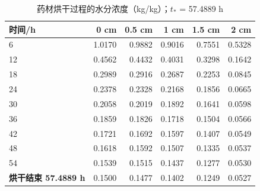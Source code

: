 \begin{table}[H]
  \centering
  \caption{药材烘干过程的水分浓度（kg/kg）；$t_*$ = 57.4889 h}
  \label{tab:p3C}
  \footnotesize
  \begin{tabular}{@{}lrrrrr@{}}
    \toprule
    时间/h & 0 cm & 0.5 cm & 1 cm & 1.5 cm & 2 cm \\
    \midrule
    6 & 1.0170 & 0.9882 & 0.9016 & 0.7551 & 0.5328 \\
    12 & 0.4562 & 0.4432 & 0.4031 & 0.3298 & 0.1642 \\
    18 & 0.2989 & 0.2916 & 0.2687 & 0.2253 & 0.0845 \\
    24 & 0.2378 & 0.2328 & 0.2168 & 0.1856 & 0.0665 \\
    30 & 0.2058 & 0.2019 & 0.1892 & 0.1641 & 0.0598 \\
    36 & 0.1859 & 0.1826 & 0.1718 & 0.1504 & 0.0566 \\
    42 & 0.1721 & 0.1692 & 0.1597 & 0.1407 & 0.0549 \\
    48 & 0.1618 & 0.1592 & 0.1507 & 0.1335 & 0.0537 \\
    54 & 0.1539 & 0.1515 & 0.1437 & 0.1277 & 0.0530 \\
    \textbf{烘干结束 57.4889 h} & 0.1500 & 0.1477 & 0.1402 & 0.1249 & 0.0527 \\
    \bottomrule
  \end{tabular}
\end{table}
